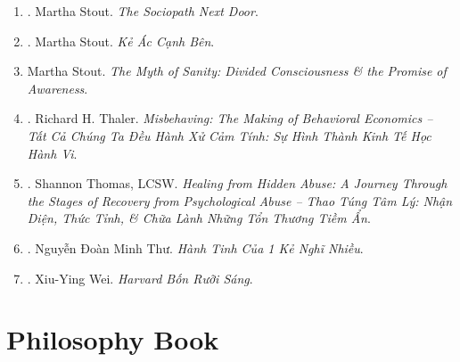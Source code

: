 \documentclass{article}
\begin{document}
\begin{enumerate}
	\item \cite{Stout2006}. Martha Stout. \textit{The Sociopath Next Door}.\hfill{\sf[reading]}
	\item \cite{Stout2019}. Martha Stout. \textit{Kẻ Ác Cạnh Bên}.\hfill{\sf[done]}	
	\item Martha Stout. \textit{The Myth of Sanity: Divided Consciousness \& the Promise of Awareness}.	
	\item \cite{Thaler_misbehaving}. Richard H. Thaler. \textit{Misbehaving: The Making of Behavioral Economics -- Tất Cả Chúng Ta Đều Hành Xử Cảm Tính: Sự Hình Thành Kinh Tế Học Hành Vi}.\hfill{\sf[reading]}
	\item \cite{Thomas2021}. Shannon Thomas, LCSW. \textit{Healing from Hidden Abuse: A Journey Through the Stages of Recovery from Psychological Abuse -- Thao Túng Tâm Lý: Nhận Diện, Thức Tỉnh, \& Chữa Lành Những Tổn Thương Tiềm Ẩn}.\hfill{\sf[done]}
	\item \cite{Thu2022}. Nguyễn Đoàn Minh Thư. \textit{Hành Tinh Của 1  Kẻ Nghĩ Nhiều}.\hfill{\sf[done]}
	\item \cite{Wei2022}. Xiu-Ying Wei. \textit{Harvard Bốn Rưỡi Sáng}.\hfill{\sf[done]}
\end{enumerate}


\section{Philosophy Book}
\end{document}
